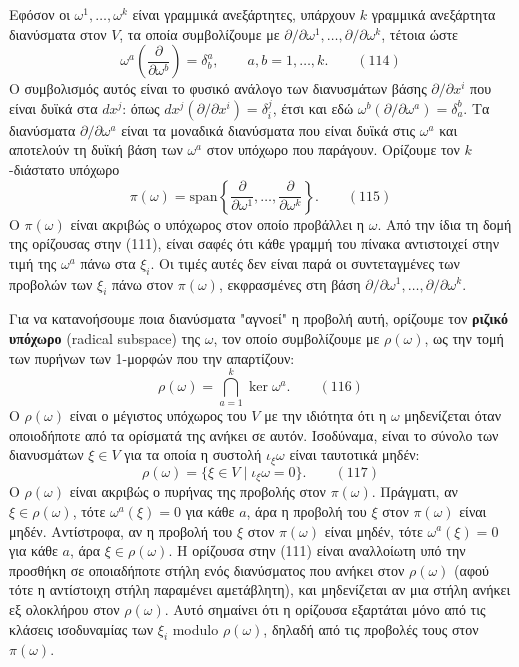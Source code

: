 \documentclass[12pt]{article}
\begin{document}
Εφόσον οι $\omega^1, \dots, \omega^k$ είναι γραμμικά ανεξάρτητες, υπάρχουν $k$ γραμμικά ανεξάρτητα διανύσματα στον $V$, τα οποία συμβολίζουμε με $\partial / \partial \omega^1, \dots, \partial / \partial \omega^k$, τέτοια ώστε
\begin{equation}
\omega^a \left( \frac{\partial}{\partial \omega^b} \right) = \delta^a_b, \qquad a, b = 1, \dots, k. \qquad (114)
\end{equation}
Ο συμβολισμός αυτός είναι το φυσικό ανάλογο των διανυσμάτων βάσης $\partial / \partial x^i$ που είναι δυϊκά στα $dx^j$: όπως $dx^j(\partial / \partial x^i) = \delta^j_i$, έτσι και εδώ $\omega^b(\partial / \partial \omega^a) = \delta^b_a$. Τα διανύσματα $\partial / \partial \omega^a$ είναι τα μοναδικά διανύσματα που είναι δυϊκά στις $\omega^a$ και αποτελούν τη δυϊκή βάση των $\omega^a$ στον υπόχωρο που παράγουν. Ορίζουμε τον $k$-διάστατο υπόχωρο
\begin{equation}
\pi(\omega) = \text{span} \left\{ \frac{\partial}{\partial \omega^1}, \dots, \frac{\partial}{\partial \omega^k} \right\}. \qquad (115)
\end{equation}
Ο $\pi(\omega)$ είναι ακριβώς ο υπόχωρος στον οποίο προβάλλει η $\omega$. Από την ίδια τη δομή της ορίζουσας στην (111), είναι σαφές ότι κάθε γραμμή του πίνακα αντιστοιχεί στην τιμή της $\omega^a$ πάνω στα $\xi_i$. Οι τιμές αυτές δεν είναι παρά οι συντεταγμένες των προβολών των $\xi_i$ πάνω στον $\pi(\omega)$, εκφρασμένες στη βάση $\partial / \partial \omega^1, \dots, \partial / \partial \omega^k$.

Για να κατανοήσουμε ποια διανύσματα "αγνοεί" η προβολή αυτή, ορίζουμε τον \textbf{ριζικό υπόχωρο} (radical subspace) της $\omega$, τον οποίο συμβολίζουμε με $\rho(\omega)$, ως την τομή των πυρήνων των 1-μορφών που την απαρτίζουν:
\begin{equation}
\rho(\omega) = \bigcap_{a=1}^k \ker \omega^a. \qquad (116)
\end{equation}
Ο $\rho(\omega)$ είναι ο μέγιστος υπόχωρος του $V$ με την ιδιότητα ότι η $\omega$ μηδενίζεται όταν οποιοδήποτε από τα ορίσματά της ανήκει σε αυτόν. Ισοδύναμα, είναι το σύνολο των διανυσμάτων $\xi \in V$ για τα οποία η συστολή $\iota_\xi \omega$ είναι ταυτοτικά μηδέν:
\begin{equation}
\rho(\omega) = \{ \xi \in V \mid \iota_\xi \omega = 0 \}. \qquad (117)
\end{equation}
Ο $\rho(\omega)$ είναι ακριβώς ο πυρήνας της προβολής στον $\pi(\omega)$. Πράγματι, αν $\xi \in \rho(\omega)$, τότε $\omega^a(\xi) = 0$ για κάθε $a$, άρα η προβολή του $\xi$ στον $\pi(\omega)$ είναι μηδέν. Αντίστροφα, αν η προβολή του $\xi$ στον $\pi(\omega)$ είναι μηδέν, τότε $\omega^a(\xi) = 0$ για κάθε $a$, άρα $\xi \in \rho(\omega)$. Η ορίζουσα στην (111) είναι αναλλοίωτη υπό την προσθήκη σε οποιαδήποτε στήλη ενός διανύσματος που ανήκει στον $\rho(\omega)$ (αφού τότε η αντίστοιχη στήλη παραμένει αμετάβλητη), και μηδενίζεται αν μια στήλη ανήκει εξ ολοκλήρου στον $\rho(\omega)$. Αυτό σημαίνει ότι η ορίζουσα εξαρτάται μόνο από τις κλάσεις ισοδυναμίας των $\xi_i$ modulo $\rho(\omega)$, δηλαδή από τις προβολές τους στον $\pi(\omega)$.
\end{document}
